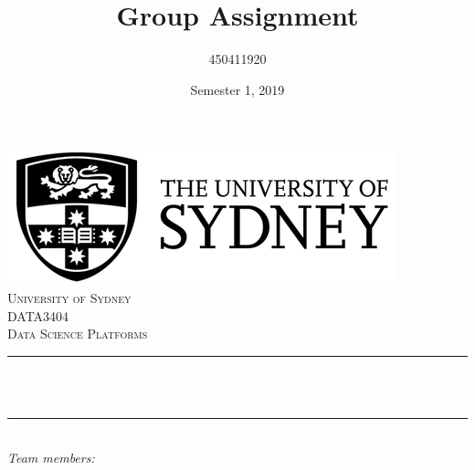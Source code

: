 \documentclass[12pt]{article}
\title{Group Assignment}								%
\author{
	450411920 \\
}								%
\date{Semester 1, 2019}											%
\makeatletter
\let\thetitle\@title
\let\theauthor\@author
\let\thedate\@date
\makeatother
\begin{document}

\begin{titlepage}
	\centering
    \vspace*{0.5 cm}
    \includegraphics[scale = 0.75]{USYD_LOGO_New.jpg}\\[1.0 cm]	%
    \textsc{\LARGE University of Sydney}\\[2.0 cm]	%
	\textsc{\Large DATA3404}\\[0.5 cm]				%
	\textsc{\large Data Science Platforms}\\[0.5 cm]				%
	\rule{\linewidth}{0.2 mm} \\[0.4 cm]
	{ \huge \bfseries \thetitle}\\
	\rule{\linewidth}{0.2 mm} \\[1.5 cm]
	
	
		
	\emph{Team members:}\\
	\theauthor
		
	\begin{minipage}{0.45\textwidth}
			
	\end{minipage}\\[2 cm]
	
	{\large \thedate}\\[2 cm]
 
	\vfill
	
\end{titlepage}


\tableofcontents
\pagebreak


{}
\end{document}
